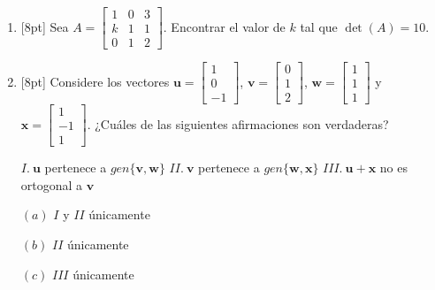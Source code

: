 \documentclass[11pt]{article}
\begin{document}
\begin{enumerate}
\item{}[8pt] Sea $A = \begin{bmatrix}1&0&3\\k&1&1\\0&1&2\end{bmatrix}$. Encontrar el valor de $k$ tal que $\det(A)=10$.

\vspace{4pt}

\item{}[8pt] Considere los vectores $\mathbf{u} = \begin{bmatrix}1\\0\\-1\end{bmatrix}$, $\mathbf{v} = \begin{bmatrix}0\\1\\2\end{bmatrix}$, $\mathbf{w} = \begin{bmatrix}1\\1\\1\end{bmatrix}$ y $\mathbf{x} = \begin{bmatrix}1\\-1\\1\end{bmatrix}$. ¿Cuáles de las siguientes afirmaciones son verdaderas?

\vspace{4pt}
\noindent $I.\ \mathbf{u}$ pertenece a $gen\{\mathbf{v},\mathbf{w}\}$ \hspace{1cm} $II.\ \mathbf{v}$ pertenece a $gen\{\mathbf{w},\mathbf{x}\}$ \hspace{1cm} $III.\ \mathbf{u}+\mathbf{x}$ no es ortogonal a $\mathbf{v}$

\vspace{6pt}
\noindent
\begin{minipage}[t]{0.33\linewidth}
$(a)$ $I$ y $II$ únicamente
\end{minipage}%
\begin{minipage}[t]{0.33\linewidth}
$(b)$ $II$ únicamente
\end{minipage}%
\begin{minipage}[t]{0.33\linewidth}
$(c)$ $III$ únicamente
\end{minipage}


\end{enumerate}
\end{document}
